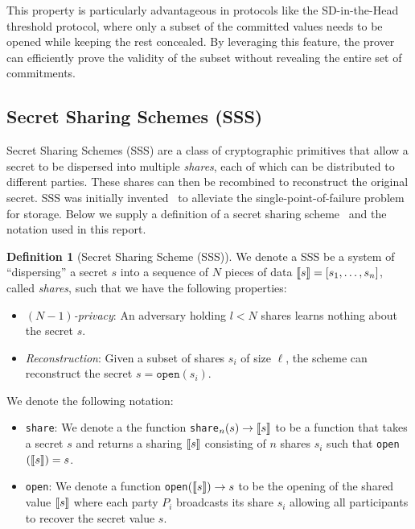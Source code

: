 \documentclass[twoside,11pt]{report}
\theoremstyle{definition}
\newtheorem{definition}{Definition}[section]
\theoremstyle{plain}
\begin{document}
This property is particularly advantageous in protocols like the SD-in-the-Head threshold protocol, where only a subset of the committed values needs to be opened while keeping the rest concealed. By leveraging this feature, the prover can efficiently prove the validity of the subset without revealing the entire set of commitments.

\subsection{Secret Sharing Schemes (SSS)}

Secret Sharing Schemes (SSS) are a class of cryptographic primitives that allow a secret to be dispersed into multiple \textit{shares}, each of which can be distributed to different parties. These shares can then be recombined to reconstruct the original secret. SSS was initially invented~\cite{shamir1979share} to alleviate the single-point-of-failure problem for storage. Below we supply a definition of a secret sharing scheme~\cite{cramer2015secure} and the notation used in this report.

\begin{definition}[Secret Sharing Scheme (SSS)]\label{def:ss-share}
  We denote a SSS be a system of ``dispersing'' a secret $s$ into a sequence of $N$ pieces of data $\llbracket s \rrbracket = [s_1, \dots, s_n]$, called \emph{shares}, such that we have the following properties:
  \begin{itemize}[parsep=0pt, itemsep=0pt]
    \item \textit{$(N-1)$-privacy}: An adversary holding $l < N$ shares learns nothing about the secret $s$.
    \item \textit{Reconstruction}: Given a subset of shares $s_i$ of size $\ell$, the scheme can reconstruct the secret $s = \texttt{open}(s_i)$.
  \end{itemize}
  We denote the following notation:
  \begin{itemize}
    \item \texttt{share}: We denote a the function \texttt{share}$_n(s) \rightarrow \llbracket s \rrbracket$ to be a function that takes a secret $s$ and returns a sharing $\llbracket s \rrbracket$ consisting of $n$ shares $s_i$ such that \texttt{open}$(\llbracket s \rrbracket) = s$.
    \item \texttt{open}: We denote a function \texttt{open}$(\llbracket s \rrbracket) \rightarrow s$ to be the opening of the shared value $\llbracket s \rrbracket$ where each party $P_i$ broadcasts its share $s_i$ allowing all participants to recover the secret value $s$.
  \end{itemize}
\end{definition}
\end{document}

